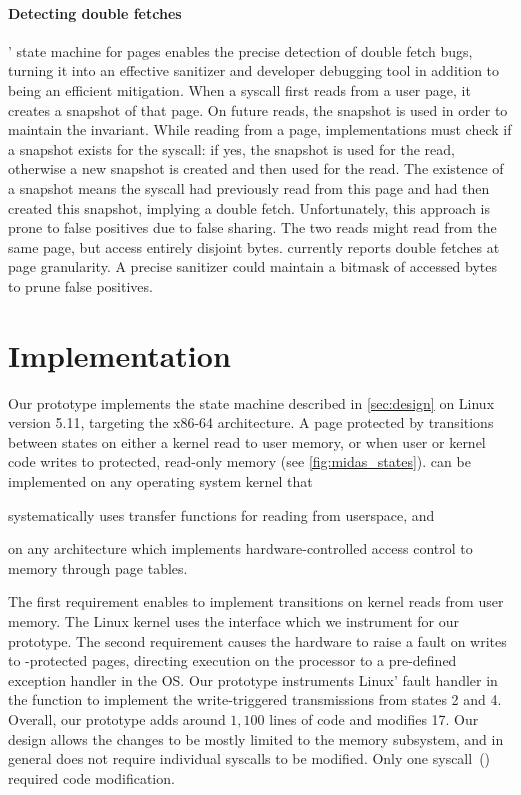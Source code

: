 \paragraph{Detecting double fetches}
\midas' state machine for pages enables the precise detection of double fetch
bugs, turning it into an effective sanitizer and developer debugging tool in
addition to being an efficient mitigation.
When a syscall first reads from a user page, it creates a snapshot
of that page.
On future reads, the snapshot is used in order to maintain the
invariant.
While reading from a page, implementations must check
if a snapshot exists for the syscall: if yes, the snapshot is used
for the read, otherwise a new snapshot is created and then used
for the read.
The existence of a snapshot means the syscall had previously
read from this page and had then created this snapshot, implying a double
fetch.
Unfortunately, this approach is prone to false positives due to false sharing.
The two reads might read from the same page, but access entirely
disjoint bytes.
\midas currently reports double fetches at page granularity.
A precise sanitizer could maintain a bitmask of accessed bytes to
prune false positives.


\section{\midas Implementation}
\label{sec:impl}

Our \midas prototype implements the state machine described in
\autoref{sec:design} on Linux version 5.11, targeting the x86-64
architecture.
A page protected by \midas transitions between states on
either a kernel read to user memory, or when user or kernel code
writes to protected, read-only memory (see \autoref{fig:midas_states}).
\midas can be implemented on any operating system kernel that
\begin{inparaenum}
\item systematically uses transfer functions for reading from userspace, and
\item on any architecture which implements hardware-controlled access
control to memory through page tables.
\end{inparaenum}
The first requirement enables \midas to implement transitions on
kernel reads from user memory.
The Linux kernel uses the  interface which
we instrument for our prototype.
The second requirement causes the hardware to raise a fault on
writes to \midas-protected pages,
directing execution on the processor to a pre-defined exception
handler in the OS.
Our prototype instruments Linux' fault handler in the function
 to implement the write-triggered transmissions
from states 2 and 4.
Overall, our prototype adds around $1,100$ lines of code and modifies
17.
Our design allows the changes to be mostly limited to the memory
subsystem, and in general does not require individual syscalls to
be modified.
Only one syscall~() required code modification.

